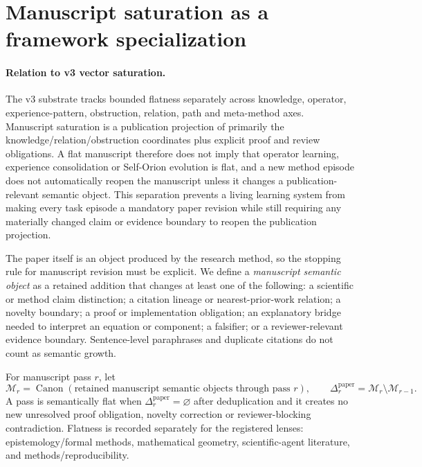 \section{Manuscript saturation as a framework specialization}


\paragraph{Relation to v3 vector saturation.}
The v3 substrate tracks bounded flatness separately across knowledge, operator, experience-pattern, obstruction, relation, path and meta-method axes. Manuscript saturation is a publication projection of primarily the knowledge/relation/obstruction coordinates plus explicit proof and review obligations. A flat manuscript therefore does not imply that operator learning, experience consolidation or Self-Orion evolution is flat, and a new method episode does not automatically reopen the manuscript unless it changes a publication-relevant semantic object. This separation prevents a living learning system from making every task episode a mandatory paper revision while still requiring any materially changed claim or evidence boundary to reopen the publication projection.

The paper itself is an object produced by the research method, so the stopping rule for manuscript revision must be explicit. We define a \emph{manuscript semantic object} as a retained addition that changes at least one of the following: a scientific or method claim distinction; a citation lineage or nearest-prior-work relation; a novelty boundary; a proof or implementation obligation; an explanatory bridge needed to interpret an equation or component; a falsifier; or a reviewer-relevant evidence boundary. Sentence-level paraphrases and duplicate citations do not count as semantic growth.

For manuscript pass \(r\), let
\[
\mathcal M_r=\operatorname{Canon}
(\text{retained manuscript semantic objects through pass }r),
\qquad
\Delta_r^{\mathrm{paper}}=\mathcal M_r\setminus\mathcal M_{r-1}.
\]
A pass is semantically flat when \(\Delta_r^{\mathrm{paper}}=\varnothing\) after deduplication and it creates no new unresolved proof obligation, novelty correction or reviewer-blocking contradiction. Flatness is recorded separately for the registered lenses: epistemology/formal methods, mathematical geometry, scientific-agent literature, and methods/reproducibility.

